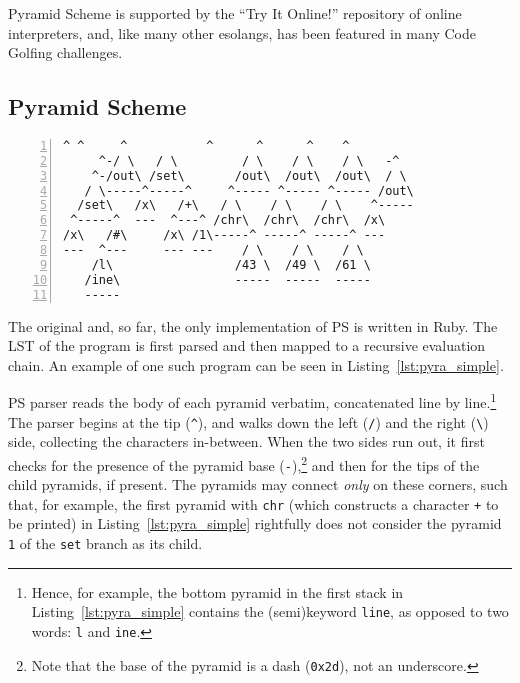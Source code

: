 \documentclass[aip,jcp,reprint]{revtex4-1}
\let\tt\texttt
\newcommand{\ilpsll}[1]{\lstinline[language=psll,columns=flexible]{#1}}
\begin{document}
Pyramid Scheme is supported by the \enquote{Try It Online!} repository of online interpreters,\cite{tio} and, like many other esolangs, has been featured in many Code Golfing challenges.\cite{golf_se}

\subsection{Pyramid Scheme}

\begin{lstlisting}[float,language=pyra,frame=tb,numbers=left,caption={\label{lst:pyra_simple}
A simple Pyramid Scheme program. It takes one input from \tt{stdin} -- \ilpsll{(set x (\# stdin))}, increments it by one -- \ilpsll{(set x (+ x 1))} and prints the result computation to the command line.
}]
      ^ ^     ^           ^      ^      ^    ^
     ^-/ \   / \         / \    / \    / \   -^
    ^-/out\ /set\       /out\  /out\  /out\  / \
   / \-----^-----^     ^----- ^----- ^----- /out\
  /set\   /x\   /+\   / \    / \    / \    ^-----
 ^-----^  ---  ^---^ /chr\  /chr\  /chr\  /x\
/x\   /#\     /x\ /1\-----^ -----^ -----^ ---
---  ^---     --- ---    / \    / \    / \
    /l\                 /43 \  /49 \  /61 \
   /ine\                -----  -----  -----
   -----
\end{lstlisting}

The original and, so far, the only implementation of PS is written in Ruby.\cite{pyra_git} The LST of the program is first parsed and then mapped to a recursive evaluation chain. An example of one such program can be seen in Listing~\ref{lst:pyra_simple}.

PS parser reads the body of each pyramid verbatim, concatenated line by line.\footnote{Hence, for example, the bottom pyramid in the first stack in Listing~\ref{lst:pyra_simple} contains the (semi)keyword \tt{line}, as opposed to two words: \tt{l} and \tt{ine}.} The parser begins at the tip (\tt{\^}), and walks down the left (\tt{/}) and the right (\tt{\textbackslash}) side, collecting the characters in-between. When the two sides run out, it first checks for the presence of the pyramid base (\tt{-}),\footnote{Note that the base of the pyramid is a dash (\tt{0x2d}), not an underscore.} and then for the tips of the child pyramids, if present. The pyramids may connect \emph{only} on these corners, such that, for example, the first pyramid with \tt{chr} (which constructs a character \tt{+} to be printed) in Listing~\ref{lst:pyra_simple} rightfully does not consider the pyramid \tt{1} of the \tt{set} branch as its child.
\end{document}

